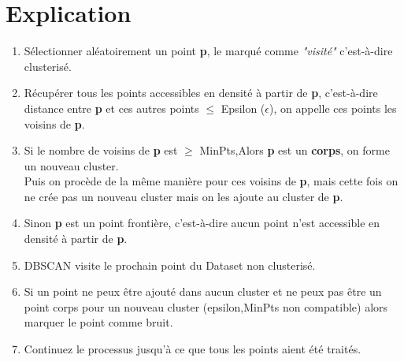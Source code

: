 \documentclass[12pt,a4paper,oneside]{book}
\begin{document}
\section{Explication}
\begin{enumerate}
	
	
	\item Sélectionner aléatoirement un point \textbf{p}, le marqué comme \textit{"visité"} c'est-à-dire clusterisé.
	
	\item Récupérer tous les points accessibles en densité à partir de \textbf{p}, c'est-à-dire distance entre \textbf{p} et ces autres points $\leq$ Epsilon ($\epsilon$), on appelle ces points les voisins de \textbf{p}.
	
	\item Si le nombre de voisins de \textbf{p} est $\geq$ MinPts,Alors \textbf{p} est un \textbf{corps}, on forme un nouveau cluster.\\
	
	Puis on procède de la même manière pour ces voisins de \textbf{p}, mais cette fois on ne crée pas un nouveau cluster mais on les ajoute au cluster de \textbf{p}.
	
	\item Sinon \textbf{p} est un point frontière, c'est-à-dire aucun point n'est accessible en densité à partir de \textbf{p}.
	
	\item DBSCAN visite le prochain point du Dataset non clusterisé.
	
	\item Si un point ne peux être ajouté dans aucun cluster et ne peux pas être un point corps pour un nouveau cluster (epsilon,MinPts non compatible) alors marquer le point comme bruit.
	
	\item Continuez le processus jusqu'à ce que tous les points aient été traités.
\end{enumerate}
\end{document}
